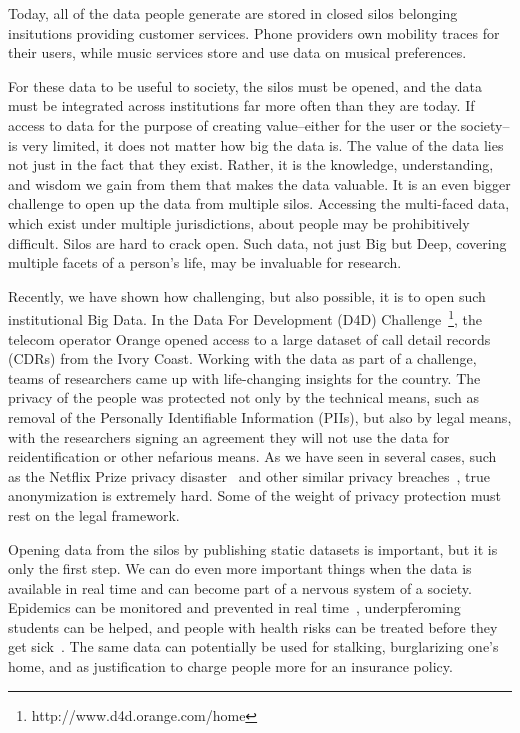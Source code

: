 Today, all of the data people generate are stored in closed silos belonging insitutions providing customer services. 
Phone providers own mobility traces for their users, while music services store and use data on musical preferences.

For these data to be useful to society, the silos must be opened, and the data must be integrated across institutions far more often than they are today.
If access to data for the purpose of creating value--either for the user or the society--is very limited, it does not matter how big the data is.
The value of the data lies not just in the fact that they exist.
Rather, it is the knowledge, understanding, and wisdom we gain from them that makes the data valuable.
It is an even bigger challenge to open up the data from multiple silos.
Accessing the multi-faced data, which exist under multiple jurisdictions, about people may be prohibitively difficult.
Silos are hard to crack open.
Such data, not just Big but Deep, covering multiple facets of a person's life, may be invaluable for research.

Recently, we have shown how challenging, but also possible, it is to open such institutional Big Data.
In the Data For Development (D4D) Challenge~\footnote{http://www.d4d.orange.com/home}, the telecom operator Orange opened access to a large dataset of call detail records (CDRs) from the Ivory Coast.
Working with the data as part of a challenge, teams of researchers came up with life-changing insights for the country.
The privacy of the people was protected not only by the technical means, such as removal of the Personally Identifiable Information (PIIs), but also by legal means, with the researchers signing an agreement they will not use the data for reidentification or other nefarious means.
As we have seen in several cases, such as the Netflix Prize privacy disaster~\cite{narayanan2008robust} and other similar privacy breaches~\cite{sweeney2000simple}, true anonymization is extremely hard.
Some of the weight of privacy protection must rest on the legal framework.

Opening data from the silos by publishing static datasets is important, but it is only the first step.
We can do even more important things when the data is available in real time and can become part of a nervous system of a society.
Epidemics can be monitored and prevented in real time~\cite{pentland2009using}, underpferoming students can be helped, and people with health risks can be treated before they get sick~\cite{tacconi2008activity}. The same data can potentially be used for stalking, burglarizing one's home, and as justification to charge people more for an insurance policy.

